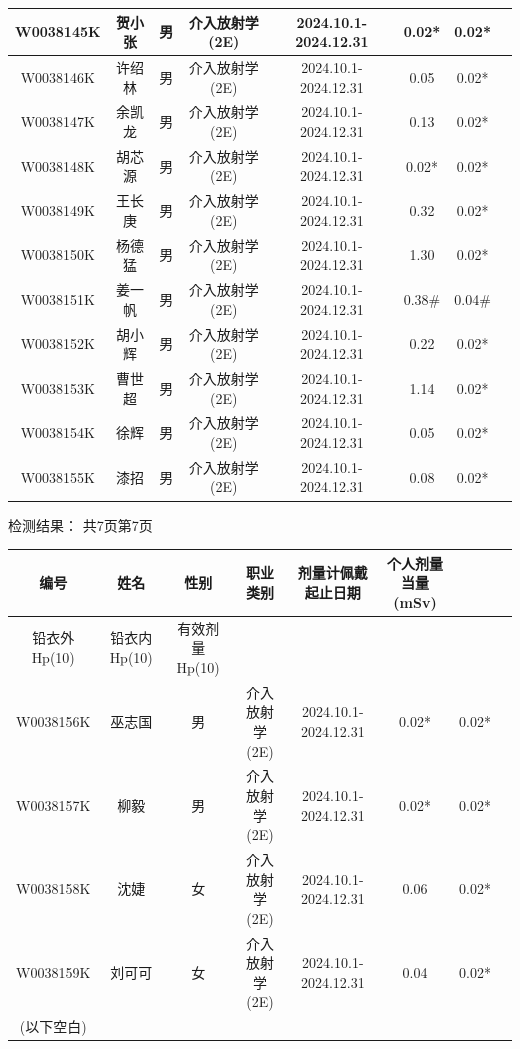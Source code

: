 \begin{table}[H]
\begin{tabular}{|c|c|c|c|c|c|c|c|}
\hline
W0038145K & 贺小张 & 男 & 介入放射学(2E) & 2024.10.1-2024.12.31 & 0.02* & 0.02* &  \\
\hline
W0038146K & 许绍林 & 男 & 介入放射学(2E) & 2024.10.1-2024.12.31 & 0.05 & 0.02* &  \\
\hline
W0038147K & 余凯龙 & 男 & 介入放射学(2E) & 2024.10.1-2024.12.31 & 0.13 & 0.02* &  \\
\hline
W0038148K & 胡芯源 & 男 & 介入放射学(2E) & 2024.10.1-2024.12.31 & 0.02* & 0.02* &  \\
\hline
W0038149K & 王长庚 & 男 & 介入放射学(2E) & 2024.10.1-2024.12.31 & 0.32 & 0.02* &  \\
\hline
W0038150K & 杨德猛 & 男 & 介入放射学(2E) & 2024.10.1-2024.12.31 & 1.30 & 0.02* &  \\
\hline
W0038151K & 姜一帆 & 男 & 介入放射学(2E) & 2024.10.1-2024.12.31 & 0.38\# & 0.04\# &  \\
\hline
W0038152K & 胡小辉 & 男 & 介入放射学(2E) & 2024.10.1-2024.12.31 & 0.22 & 0.02* &  \\
\hline
W0038153K & 曹世超 & 男 & 介入放射学(2E) & 2024.10.1-2024.12.31 & 1.14 & 0.02* &  \\
\hline
W0038154K & 徐辉 & 男 & 介入放射学(2E) & 2024.10.1-2024.12.31 & 0.05 & 0.02* &  \\
\hline
W0038155K & 漆招 & 男 & 介入放射学(2E) & 2024.10.1-2024.12.31 & 0.08 & 0.02* &  \\
\hline
\end{tabular}
\end{table}


检测结果：
共7页第7页

\begin{table}[H]
\centering
\begin{tabular}{|c|c|c|c|c|c|c|c|}
\hline
编号 & 姓名 & 性别 & 职业类别 & 剂量计佩戴起止日期 & 个人剂量当量(mSv) &  &  \\
\hline
铅衣外Hp(10) & 铅衣内Hp(10) & 有效剂量Hp(10) &  &  &  &  &  \\
\hline
W0038156K & 巫志国 & 男 & 介入放射学(2E) & 2024.10.1-2024.12.31 & 0.02* & 0.02* &  \\
\hline
W0038157K & 柳毅 & 男 & 介入放射学(2E) & 2024.10.1-2024.12.31 & 0.02* & 0.02* &  \\
\hline
W0038158K & 沈婕 & 女 & 介入放射学(2E) & 2024.10.1-2024.12.31 & 0.06 & 0.02* &  \\
\hline
W0038159K & 刘可可 & 女 & 介入放射学(2E) & 2024.10.1-2024.12.31 & 0.04 & 0.02* &  \\
\hline
(以下空白) &  &  &  &  &  &  &  \\
\hline
\end{tabular}
\end{table}


